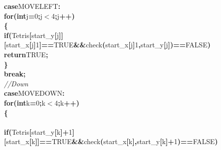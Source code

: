 \documentclass[a4paper, 10pt]{article}
\newcommand\SPC{\hspace*{0.6em}}
\newcommand\HYP{\mbox{\char 45}}
\newcommand{\CppAComment}[1]{\textit{\textcolor[rgb]{0.2,0.6,1}{#1}}}
\newcommand{\CppAIdentifier}[1]{#1}
\newcommand{\CppANumber}[1]{\textcolor[rgb]{0.5,0,0.5}{#1}}
\newcommand{\CppAReservedWord}[1]{\textbf{#1}}
\newcommand{\CppASpace}[1]{\colorbox[rgb]{1,1,1}{#1}}
\newcommand{\CppASymbol}[1]{\textbf{\textcolor[rgb]{1,0,0}{#1}}}
\begin{document}
\begin{ttfamily}
\CppASpace{\SPC \SPC }\CppAReservedWord{case}\CppASpace{\SPC }\CppAIdentifier{MOVELEFT}\CppASymbol{:}\\
\CppASpace{\SPC \SPC }\CppAReservedWord{for}\CppASymbol{(}\CppAReservedWord{int}\CppASpace{\SPC }\CppAIdentifier{j}\CppASymbol{=}\CppANumber{0}\CppASymbol{;}\CppAIdentifier{j}\CppASymbol{$<$}\CppANumber{4}\CppASymbol{;}\CppAIdentifier{j}\CppASymbol{++}\CppASymbol{)}\\
\CppASpace{\SPC \SPC }\CppASymbol{\{}\\
\CppASpace{\SPC \SPC \SPC }\CppAReservedWord{if}\CppASymbol{(}\CppAIdentifier{Tetris}\CppASymbol{[}\CppAIdentifier{start\_y}\CppASymbol{[}\CppAIdentifier{j}\CppASymbol{]}\CppASymbol{]}\CppASymbol{[}\CppAIdentifier{start\_x}\CppASymbol{[}\CppAIdentifier{j}\CppASymbol{]}\CppASymbol{\HYP }\CppANumber{1}\CppASymbol{]}\CppASymbol{==}\CppAIdentifier{TRUE}\CppASpace{\SPC }\CppASymbol{\&\&}\CppASpace{\SPC }\CppAIdentifier{check}\CppASymbol{(}\CppAIdentifier{start\_x}\CppASymbol{[}\CppAIdentifier{j}\CppASymbol{]}\CppASymbol{\HYP }\CppANumber{1}\CppASymbol{,}\CppAIdentifier{start\_y}\CppASymbol{[}\CppAIdentifier{j}\CppASymbol{]}\CppASymbol{)}\CppASymbol{==}\CppAIdentifier{FALSE}\CppASymbol{)}\\
\CppASpace{\SPC \SPC \SPC \SPC }\CppAReservedWord{return}\CppASpace{\SPC }\CppAIdentifier{TRUE}\CppASymbol{;}\\
\CppASpace{\SPC \SPC }\CppASymbol{\}}\\
\CppASpace{\SPC \SPC }\CppAReservedWord{break}\CppASymbol{;}\\
\CppASpace{\SPC \SPC }\CppAComment{//Down}\\
\CppASpace{\SPC \SPC }\CppAReservedWord{case}\CppASpace{\SPC }\CppAIdentifier{MOVEDOWN}\CppASymbol{:}\\
\CppASpace{\SPC \SPC }\CppAReservedWord{for}\CppASymbol{(}\CppAReservedWord{int}\CppASpace{\SPC }\CppAIdentifier{k}\CppASymbol{=}\CppANumber{0}\CppASymbol{;}\CppAIdentifier{k}\CppASymbol{$<$}\CppANumber{4}\CppASymbol{;}\CppAIdentifier{k}\CppASymbol{++}\CppASymbol{)}\\
\CppASpace{\SPC \SPC }\CppASymbol{\{}\\
\\
\CppASpace{\SPC \SPC \SPC }\CppAReservedWord{if}\CppASymbol{(}\CppAIdentifier{Tetris}\CppASymbol{[}\CppAIdentifier{start\_y}\CppASymbol{[}\CppAIdentifier{k}\CppASymbol{]}\CppASymbol{+}\CppANumber{1}\CppASymbol{]}\CppASymbol{[}\CppAIdentifier{start\_x}\CppASymbol{[}\CppAIdentifier{k}\CppASymbol{]}\CppASymbol{]}\CppASymbol{==}\CppAIdentifier{TRUE}\CppASpace{\SPC }\CppASymbol{\&\&}\CppASpace{\SPC }\CppAIdentifier{check}\CppASymbol{(}\CppAIdentifier{start\_x}\CppASymbol{[}\CppAIdentifier{k}\CppASymbol{]}\CppASymbol{,}\CppAIdentifier{start\_y}\CppASymbol{[}\CppAIdentifier{k}\CppASymbol{]}\CppASymbol{+}\CppANumber{1}\CppASymbol{)}\CppASymbol{==}\CppAIdentifier{FALSE}\CppASymbol{)}\\

\end{ttfamily}
\end{document}
